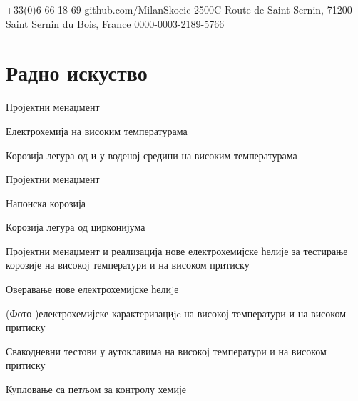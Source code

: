 \documentclass[11pt, a4paper, notitlepage]{article}
\begin{document}
\selectfont
\pagestyle{empty}
	\newpage

	
	
	{+33(0)6 66 18 69}
	{github.com/MilanSkocic}
	{2500C Route de Saint Sernin, 71200 Saint Sernin du Bois, France}
	{0000-0003-2189-5766}

	\section*{Радно искуство}

	\begin{jobdetails}[T2A]
		\item Пројектни менаџмент
 		\item Електрохемија на високим температурама
		\item Корозија легура од  и  у воденој средини на високим температурама
	\end{jobdetails}
		
	\begin{jobdetails}[T2A]
		\item Пројектни менаџмент
		\item Напонска корозија 
		\item Корозија легура од цирконијума
	\end{jobdetails}

	\begin{jobdetails}[T2A]
		\item Пројектни менаџмент и реализација нове електрохемијске ћелије за тестирање корозије на високој температури и на високом притиску
		\item Оверавање нове електрохемијске ћелиjе
		\item (Фото-)електрохемијске карактеризациje на високој температури и на високом притиску
		\item Свакодневни тестови у аутоклавима на високој температури и на високом притиску
		\item Купловање са петљом за контролу хемије
	\end{jobdetails}
	
\end{document}
